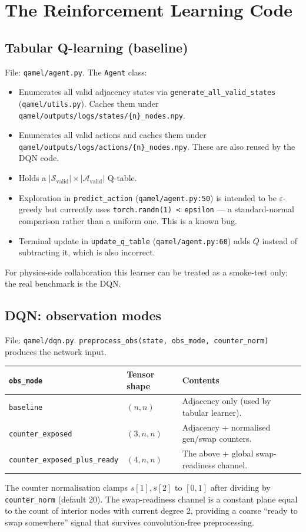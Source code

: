 \documentclass[11pt]{article}
\newcommand{\code}[1]{\texttt{#1}}
\newcommand{\file}[1]{\texttt{\small #1}}
\begin{document}
\section{The Reinforcement Learning Code}
\label{sec:rl}

\subsection{Tabular Q-learning (baseline)}
File: \file{qamel/agent.py}. The \code{Agent} class:
\begin{itemize}
  \item Enumerates all valid adjacency states via \code{generate\_all\_valid\_states} (\file{qamel/utils.py}). Caches them under \file{qamel/outputs/logs/states/\{n\}\_nodes.npy}.
  \item Enumerates all valid actions and caches them under \file{qamel/outputs/logs/actions/\{n\}\_nodes.npy}. These are also reused by the DQN code.
  \item Holds a $|\mathcal{S}_{\text{valid}}| \times |\mathcal{A}_{\text{valid}}|$ Q-table.
  \item Exploration in \code{predict\_action} (\file{qamel/agent.py:50}) is intended to be $\varepsilon$-greedy but currently uses \code{torch.randn(1) < epsilon} --- a standard-normal comparison rather than a uniform one. This is a known bug.
  \item Terminal update in \code{update\_q\_table} (\file{qamel/agent.py:60}) adds $Q$ instead of subtracting it, which is also incorrect.
\end{itemize}
For physics-side collaboration this learner can be treated as a smoke-test only; the real benchmark is the DQN.

\subsection{DQN: observation modes}
File: \file{qamel/dqn.py}. \code{preprocess\_obs(state, obs\_mode, counter\_norm)} produces the network input.

\begin{center}
\begin{tabular}{lll}
\toprule
\code{obs\_mode} & Tensor shape & Contents \\
\midrule
\code{baseline} & $(n,n)$ & Adjacency only (used by tabular learner). \\
\code{counter\_exposed} & $(3,n,n)$ & Adjacency + normalised gen/swap counters. \\
\code{counter\_exposed\_plus\_ready} & $(4,n,n)$ & The above + global swap-readiness channel. \\
\bottomrule
\end{tabular}
\end{center}
The counter normalisation clamps $s[1], s[2]$ to $[0,1]$ after dividing by \code{counter\_norm} (default 20). The swap-readiness channel is a constant plane equal to the count of interior nodes with current degree 2, providing a coarse ``ready to swap somewhere'' signal that survives convolution-free preprocessing.
\end{document}
